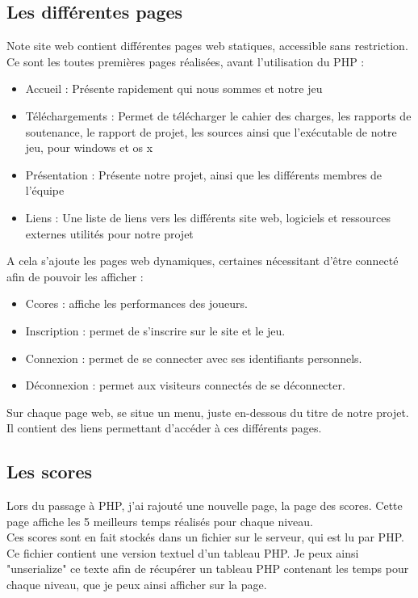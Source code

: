 \documentclass[12pt]{article}
\begin{document}
\subsection{Les différentes pages}

Note site web contient différentes pages web statiques,  accessible sans restriction. Ce sont les toutes premières pages réalisées, avant l'utilisation du PHP :

\begin{itemize}
\item Accueil : Présente rapidement qui nous sommes et notre jeu
\item Téléchargements : Permet de télécharger le cahier des charges, les rapports de soutenance, le rapport de projet, les sources ainsi que l'exécutable de notre jeu, pour windows et os x
\item Présentation : Présente notre projet, ainsi que les différents membres de l'équipe
\item Liens : Une liste de liens vers les différents site web, logiciels et ressources externes utilités pour notre projet
\end{itemize}

A cela s'ajoute les pages web dynamiques, certaines nécessitant d'être connecté afin de pouvoir les afficher :

\begin{itemize}
\item Ccores : affiche les performances des joueurs.
\item Inscription : permet de s'inscrire sur le site et le jeu.
\item Connexion : permet de se connecter avec ses identifiants personnels.
\item Déconnexion : permet aux visiteurs connectés de se déconnecter.
\end{itemize}

Sur chaque page web, se situe un menu, juste en-dessous du titre de notre projet. Il contient des liens permettant d'accéder à ces différents pages.

\subsection{Les scores}

Lors du passage à PHP, j'ai rajouté une nouvelle page, la page des scores. Cette page affiche les 5 meilleurs temps réalisés pour chaque niveau.\\
Ces scores sont en fait stockés dans un fichier sur le serveur, qui est lu par PHP. Ce fichier contient une version textuel d'un tableau PHP. Je peux ainsi "unserialize" ce texte afin de récupérer un tableau PHP contenant les temps pour chaque niveau, que je peux ainsi afficher sur la page.\\
\end{document}
